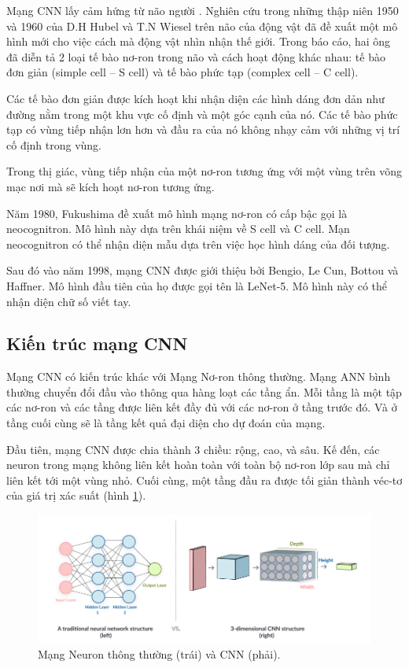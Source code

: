 Mạng CNN lấy cảm hứng từ não người \cite{cnnhumanbrain}. Nghiên cứu trong những thập niên 1950 và 1960 của D.H Hubel và T.N Wiesel trên não của động vật đã đề xuất một mô hình mới cho việc cách mà động vật nhìn nhận thế giới. Trong báo cáo, hai ông đã diễn tả 2 loại tế bào nơ-ron trong não và cách hoạt động khác nhau: tế bào đơn giản (simple cell – S cell) và tế bào phức tạp (complex cell – C cell). 

Các tế bào đơn giản được kích hoạt khi nhận diện các hình dáng đơn dản như đường nằm trong một khu vực cố định và một góc cạnh của nó. Các tế bào phức tạp có vùng tiếp nhận lơn hơn và đầu ra của nó không nhạy cảm với những vị trí cố định trong vùng. 

Trong thị giác, vùng tiếp nhận của một nơ-ron tương ứng với một vùng trên võng mạc nơi mà sẽ kích hoạt nơ-ron tương ứng. 

Năm 1980, Fukushima đề xuất mô hình mạng nơ-ron có cấp bậc gọi là neocognitron. Mô hình này dựa trên khái niệm về S cell và C cell. Mạn neocognitron có thể nhận diện mẫu dựa trên việc học hình dáng của đối tượng. 

Sau đó vào năm 1998, mạng CNN được giới thiệu bởi Bengio, Le Cun, Bottou và Haffner. Mô hình đầu tiên của họ được gọi tên là LeNet-5. Mô hình này có thể nhận diện chữ số viết tay.

\subsection{Kiến trúc mạng CNN}
Mạng CNN có kiến trúc khác với Mạng Nơ-ron thông thường. Mạng ANN bình thường chuyển đổi đầu vào thông qua hàng loạt các tầng ẩn. Mỗi tầng là một tập các nơ-ron và các tầng được liên kết đầy đủ với các nơ-ron ở tầng trước đó. Và ở tầng cuối cùng sẽ là tầng kết quả đại diện cho dự đoán của mạng.

Đầu tiên, mạng CNN được chia thành 3 chiều: rộng, cao, và sâu. Kế đến, các neuron trong mạng không liên kết hoàn toàn với toàn bộ nơ-ron lớp sau mà chỉ liên kết tới một vùng nhỏ. Cuối cùng, một tầng đầu ra được tối giản thành véc-tơ của giá trị xác suất (hình \ref{fig:neuronnetwork}).

\begin{figure}[H]
	\centering
	\includegraphics[width=1\linewidth]{images/neuronnetwork}
	\caption{Mạng Neuron thông thường (trái) và CNN (phải).}
	\label{fig:neuronnetwork}
\end{figure}

